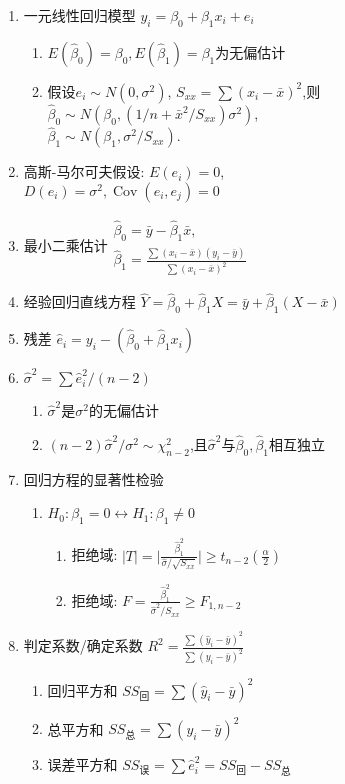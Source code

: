 \documentclass[10pt,a4paper,nofonts]{ctexart}
\renewcommand{\ge}{\geqslant}
\DeclareMathOperator{\Cov}{Cov}
\begin{document}
\begin{multicols}{2}
\begin{enumerate}
\item 一元线性回归模型 $y_i=\beta_0+\beta_1x_i+e_i$
\begin{enumerate}[label={\sf 性质\arabic*}]
\item $E(\hat\beta_0)=\beta_0,E(\hat\beta_1)=\beta_1$为无偏估计
\item 假设$e_i\sim N(0,\sigma^2)$, $S_{xx}=\sum(x_i-\bar x)^2$,则\\
$\hat\beta_0\sim N(\beta_0,(1/n+\bar x^2/S_{xx})\sigma^2)$,\\
$\hat\beta_1\sim N(\beta_1,\sigma^2/S_{xx})$.
\end{enumerate}
\item 高斯-马尔可夫假设: $E(e_i)=0$,\\$D(e_i)=\sigma^2, \Cov(e_i,e_j)=0$
\item 最小二乘估计$\begin{array}{l}
\hat\beta_0=\bar{y}-\hat\beta_1\bar{x},\\
\hat\beta_1=\frac{\sum(x_i-\bar x)(y_i-\bar y)}{\sum(x_i-\bar x)^2}
\end{array}$
\item 经验回归直线方程 $\hat{Y}=\hat\beta_0+\hat\beta_1X=\bar{y}+\hat\beta_1(X-\bar{x})$
\item 残差 $\hat e_i=y_i-(\hat\beta_0+\hat\beta_1x_i)$
\item $\hat\sigma^2=\sum\hat e^2_i/(n-2)$
\begin{enumerate}
\item $\hat\sigma^2$是$\sigma^2$的无偏估计
\item $(n-2)\hat\sigma^2/\sigma^2\sim\chi^2_{n-2}$,且$\hat\sigma^2$与$\hat\beta_0,\hat\beta_1$相互独立
\end{enumerate}

\item 回归方程的显著性检验
\begin{enumerate}
\item $H_0:\beta_1=0\leftrightarrow H_1:\beta_1\neq0$
\begin{enumerate}
\item 拒绝域: $|T|=\big|\frac{\hat\beta_1^2}{\hat\sigma/\sqrt{S_{xx}}}\big|\ge t_{n-2}(\frac{\alpha}{2})$
\item 拒绝域: $F=\frac{\hat\beta_1^2}{\hat\sigma^2/{S_{xx}}}\ge F_{1,n-2}$
\end{enumerate}
\end{enumerate}

\item 判定系数/确定系数 $R^2=\frac{\sum(\hat y_i-\bar y)^2}{\sum(y_i-\bar y)^2}$
\begin{enumerate}
\item 回归平方和 $SS_{\text{回}}=\sum(\hat y_i-\bar y)^2$
\item 总平方和 $SS_{\text{总}}=\sum(y_i-\bar y)^2$
\item 误差平方和 $SS_{\text{误}}=\sum\hat e^2_i=SS_{\text{回}}-SS_{\text{总}}$
\end{enumerate}


\end{enumerate}
\end{multicols}
\end{document}
